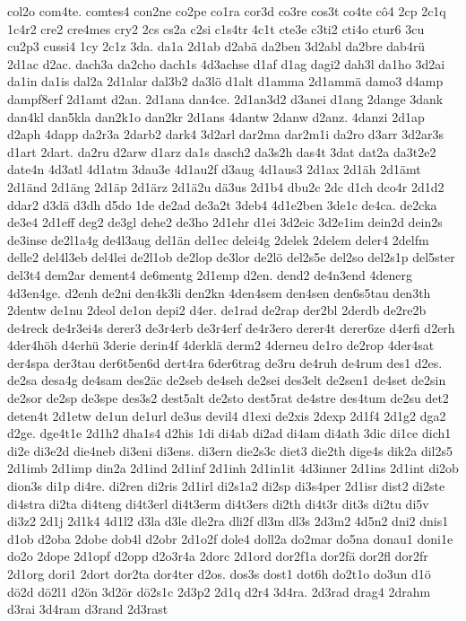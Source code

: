 {col2o
com4te.
comtes4
con2ne
co2pe
co1ra
cor3d
co3re
cos3t
co4te
cô4
2cp
2c1q
1c4r2
cre2
cre4mes
cry2
2cs
cs2a
c2si
c1s4tr
4c1t
cte3e
c3ti2
cti4o
ctur6
3cu
cu2p3
cussi4
1cy
2c1z
3da.
da1a
2d1ab
d2abä
da2ben
3d2abl
da2bre
dab4rü
2d1ac
d2ac.
dach3a
da2cho
dach1s
4d3achse
d1af
d1ag
dagi2
dah3l
da1ho
3d2ai
da1in
da1is
dal2a
2d1alar
dal3b2
da3lö
d1alt
d1amma
2d1ammä
damo3
d4amp
dampf8erf
2d1amt
d2an.
2d1ana
dan4ce.
2d1an3d2
d3anei
d1ang
2dange
3dank
dan4kl
dan5kla
dan2k1o
dan2kr
2d1ans
4dantw
2danw
d2anz.
4danzi
2d1ap
d2aph
4dapp
da2r3a
2darb2
dark4
3d2arl
dar2ma
dar2m1i
da2ro
d3arr
3d2ar3s
d1art
2dart.
da2ru
d2arw
d1arz
da1s
dasch2
da3s2h
das4t
3dat
dat2a
da3t2e2
date4n
4d3atl
4d1atm
3dau3e
4d1au2f
d3aug
4d1aus3
2d1ax
2d1äh
2d1ämt
2d1änd
2d1äng
2d1äp
2d1ärz
2d1ä2u
dä3us
2d1b4
dbu2c
2dc
d1ch
dco4r
2d1d2
ddar2
d3dä
d3dh
d5do
1de
de2ad
de3a2t
3deb4
4d1e2ben
3de1c
de4ca.
de2cka
de3e4
2d1eff
deg2
de3gl
dehe2
de3ho
2d1ehr
d1ei
3d2eic
3d2e1im
dein2d
dein2s
de3inse
de2l1a4g
de4l3aug
del1än
del1ec
delei4g
2delek
2delem
deler4
2delfm
delle2
del4l3eb
del4lei
de2l1ob
de2lop
de3lor
de2lö
del2s5e
del2so
del2s1p
del5ster
del3t4
dem2ar
dement4
de6mentg
2d1emp
d2en.
dend2
de4n3end
4denerg
4d3en4ge.
d2enh
de2ni
den4k3li
den2kn
4den4sem
den4sen
den6s5tau
den3th
2dentw
de1nu
2deol
de1on
depi2
d4er.
de1rad
de2rap
der2bl
2derdb
de2re2b
de4reck
de4r3ei4s
derer3
de3r4erb
de3r4erf
de4r3ero
derer4t
derer6ze
d4erfi
d2erh
4der4höh
d4erhü
3derie
derin4f
4derklä
derm2
4derneu
de1ro
de2rop
4der4sat
der4spa
der3tau
der6t5en6d
dert4ra
6der6trag
de3ru
de4ruh
de4rum
des1
d2es.
de2sa
desa4g
de4sam
des2äc
de2seb
de4seh
de2sei
des3elt
de2sen1
de4set
de2sin
de2sor
de2sp
de3spe
des3s2
dest5alt
de2sto
dest5rat
de4stre
des4tum
de2su
det2
deten4t
2d1etw
de1un
de1url
de3us
devil4
d1exi
de2xis
2dexp
2d1f4
2d1g2
dga2
d2ge.
dge4t1e
2d1h2
dha1s4
d2his
1di
di4ab
di2ad
di4am
di4ath
3dic
di1ce
dich1
di2e
di3e2d
die4neb
di3eni
di3ens.
di3ern
die2s3c
diet3
die2th
dige4s
dik2a
dil2s5
2d1imb
2d1imp
din2a
2d1ind
2d1inf
2d1inh
2d1in1it
4d3inner
2d1ins
2d1int
di2ob
dion3s
di1p
di4re.
di2ren
di2ris
2d1irl
di2s1a2
di2sp
di3s4per
2d1isr
dist2
di2ste
di4stra
di2ta
di4teng
di4t3erl
di4t3erm
di4t3ers
di2th
di4t3r
dit3s
di2tu
di5v
di3z2
2d1j
2d1k4
4d1l2
d3la
d3le
dle2ra
dli2f
dl3m
dl3s
2d3m2
4d5n2
dni2
dnis1
d1ob
d2oba
2dobe
dob4l
d2obr
2d1o2f
dole4
doll2a
do2mar
do5na
donau1
doni1e
do2o
2dope
2d1opf
d2opp
d2o3r4a
2dorc
2d1ord
dor2f1a
dor2fä
dor2fl
dor2fr
2d1org
dori1
2dort
dor2ta
dor4ter
d2os.
dos3s
dost1
dot6h
do2t1o
do3un
d1ö
dö2d
dö2l1
d2ön
3d2ör
dö2s1c
2d3p2
2d1q
d2r4
3d4ra.
2d3rad
drag4
2drahm
d3rai
3d4ram
d3rand
2d3rast
}
